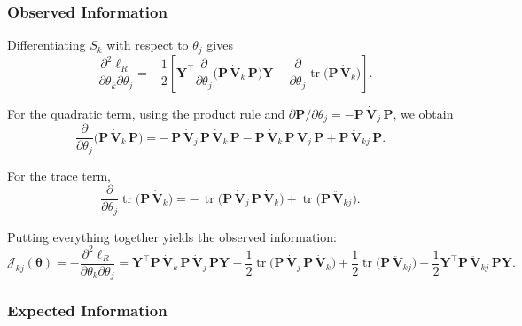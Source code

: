 \documentclass[
  letterpaper,
  DIV=11,
  numbers=noendperiod]{scrartcl}
\begin{document}
\subsubsection{Observed Information}\label{observed-information}

Differentiating \(S_k\) with respect to \(\theta_j\) gives
\begin{equation}
-\frac{\partial^2 \ell_R}{\partial \theta_k \partial \theta_j}
=
-\frac{1}{2}
\left[
\symbf{Y}^\top
\frac{\partial}{\partial \theta_j}
\big(\symbf{P}\,\dot{\symbf{V}}_k\,\symbf{P}\big)
\symbf{Y}
-
\frac{\partial}{\partial \theta_j}
\operatorname{tr}\!\big(\symbf{P}\,\dot{\symbf{V}}_k\big)
\right].
\end{equation}

For the quadratic term, using the product rule and
\(\partial \symbf{P}/\partial \theta_j = -\symbf{P}\,\dot{\symbf{V}}_j\,\symbf{P}\),
we obtain \begin{equation}
\frac{\partial}{\partial \theta_j}
\big(\symbf{P}\,\dot{\symbf{V}}_k\,\symbf{P}\big)
=
-\,\symbf{P}\,\dot{\symbf{V}}_j\,\symbf{P}\,\dot{\symbf{V}}_k\,\symbf{P}
-
\symbf{P}\,\dot{\symbf{V}}_k\,\symbf{P}\,\dot{\symbf{V}}_j\,\symbf{P}
+
\symbf{P}\,\ddot{\symbf{V}}_{kj}\,\symbf{P}.
\end{equation}

For the trace term, \begin{equation}
\frac{\partial}{\partial \theta_j}
\operatorname{tr}\!\big(\symbf{P}\,\dot{\symbf{V}}_k\big)
=
-\,\operatorname{tr}\!\big(
\symbf{P}\,\dot{\symbf{V}}_j\,\symbf{P}\,\dot{\symbf{V}}_k
\big)
+
\operatorname{tr}\!\big(
\symbf{P}\,\ddot{\symbf{V}}_{kj}
\big).
\end{equation}

Putting everything together yields the observed information:
\begin{equation}
\mathcal{J}_{kj}(\symbf{\theta}) = -\frac{\partial^2 \ell_R}{\partial \theta_k \partial \theta_j}
=
\symbf{Y}^\top
\symbf{P}\,\dot{\symbf{V}}_k\,\symbf{P}\,\dot{\symbf{V}}_j\,\symbf{P}
\symbf{Y}
-\frac{1}{2}
\operatorname{tr}\!\big(
\symbf{P}\,\dot{\symbf{V}}_j\,\symbf{P}\,\dot{\symbf{V}}_k
\big)
+\frac{1}{2}
\operatorname{tr}\!\big(
\symbf{P}\,\ddot{\symbf{V}}_{kj}
\big)
- \frac{1}{2} \symbf{Y}^\top \symbf{P}\,\ddot{\symbf{V}}_{kj}\,\symbf{P}\symbf{Y}.
\end{equation}

\subsubsection{Expected Information}\label{expected-information}
\end{document}
